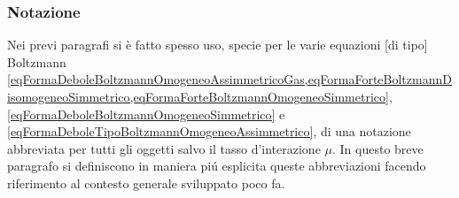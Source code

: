             \subsubsection{Notazione}

                Nei previ paragrafi si è fatto spesso uso, specie per le varie equazioni [di tipo] Boltzmann \cref{eqFormaDeboleBoltzmannOmogeneoAssimmetricoGas,eqFormaForteBoltzmannDisomogeneoSimmetrico,eqFormaForteBoltzmannOmogeneoSimmetrico}, \ref{eqFormaDeboleBoltzmannOmogeneoSimmetrico} e \ref{eqFormaDeboleTipoBoltzmannOmogeneoAssimmetrico}, di una notazione abbreviata per tutti gli oggetti salvo il tasso d'interazione \(\mu\). In questo breve paragrafo si definiscono in maniera piú esplicita queste abbreviazioni facendo riferimento al contesto generale sviluppato poco fa.
                

